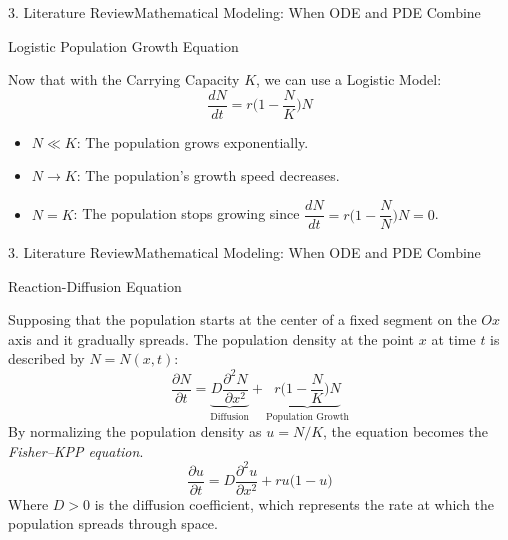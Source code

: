 \documentclass[10pt]{beamer}
\begin{document}
    \begin{frame}{3. Literature Review}{Mathematical Modeling: When ODE and PDE Combine}
      \begin{center}
        \begin{block}{Logistic Population Growth Equation}
            \begin{minipage}{\textwidth}
              Now that with the Carrying Capacity $K$, we can use a Logistic Model:
              $$
              \dfrac{dN}{dt} = r\Big(1 - \dfrac{N}{K}\Big)N
              $$
              \begin{itemize}
              \item $N \ll K$: The population grows exponentially.
              \item $N \rightarrow K$: The population's growth speed decreases.
              \item $N = K$: The population stops growing since $\dfrac{dN}{dt} = r\Big(1-\dfrac{N}{N}\Big)N = 0$.
              \end{itemize}
            \end{minipage}
        \end{block}
      \end{center}
    \end{frame}
    
    \begin{frame}{3. Literature Review}{Mathematical Modeling: When ODE and PDE Combine}
      \begin{center}
        \begin{block}{Reaction-Diffusion Equation}
            \begin{minipage}{\textwidth}
              Supposing that the population starts at the center of a fixed segment on the $Ox$ axis and it gradually spreads. The population density at the point $x$ at time $t$ is described by $N = N(x,t)$:
              $$
              \dfrac{\partial N}{\partial t} = \underbrace{D\dfrac{\partial^2 N}{\partial x^2}}_{\text{Diffusion}} + \underbrace{r\Big(1-\dfrac{N}{K}\Big)N}_{\text{Population Growth}}
              $$
              By normalizing the population density as $u = N/K$, the equation becomes the \textit{Fisher--KPP equation}.
              $$
              \dfrac{\partial u}{\partial t} = D\dfrac{\partial^2 u}{\partial x^2} + ru\Big(1-u\Big)
              $$
              Where $D > 0$ is the diffusion coefficient, which represents the rate at which the population spreads through space.
            \end{minipage}
        \end{block}
      \end{center}
    \end{frame}
\end{document}
